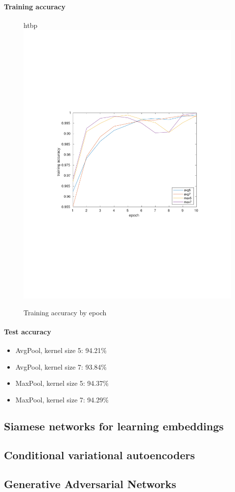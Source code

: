\documentclass[12pt]{article}
\begin{document}
\paragraph{Training accuracy}
\begin{figure}{htbp}
    \centering
    \includegraphics[trim={3in 3.5in 3in 3.5in},scale=0.7]{./Homework3/output/cnn/accuracy.pdf}
    \caption{Training accuracy by epoch}
    \label{hw3p1}
\end{figure}
\paragraph{Test accuracy}
\begin{itemize}
    \item AvgPool, kernel size 5: 94.21\%
    \item AvgPool, kernel size 7: 93.84\%
    \item MaxPool, kernel size 5: 94.37\%
    \item MaxPool, kernel size 7: 94.29\%
\end{itemize}


\subsection{Siamese networks for learning embeddings}
\subsection{Conditional variational autoencoders}
\subsection{Generative Adversarial Networks}
\end{document}
